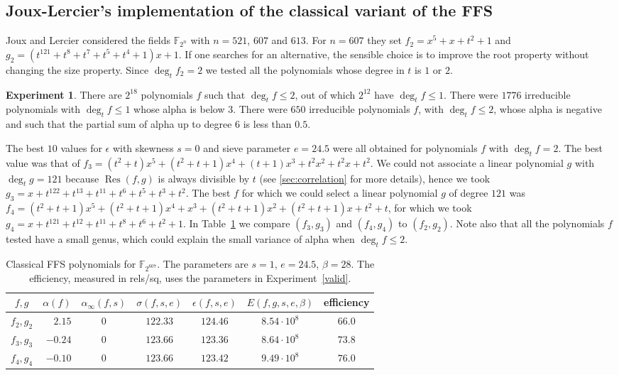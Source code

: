 \documentclass[a4wide]{article}
\newcommand{\F}{{\mathbb F}}
\DeclareMathOperator{\Res}{Res}
\theoremstyle{plain}
\theoremstyle{definition}
\newtheorem{experiment}{Experiment}
\theoremstyle{remark}
\begin{document}
\subsection{Joux-Lercier's implementation of the classical variant of the FFS}
\label{ssec:classical}
Joux and Lercier \cite{JoLe02,JoLe07} considered the fields $\F_{2^n}$ with
$n=521$, $607$ and $613$. For $n=607$ they set $f_2=x^5 + x + t^2 + 1$ and
$g_2=(t^{121} + t^8 + t^7 + t^5 + t^4 + 1)x + 1$. If one searches for an
alternative, the sensible choice is to improve the root property without
changing the size property. Since $\deg_tf_2=2$ we tested all the
polynomials whose degree in $t$ is $1$ or $2$. 
\begin{experiment}
	There are $2^{18}$ polynomials $f$ such that $\deg_tf\leq 2$, out
	of which $2^{12}$ have $\deg_tf\leq 1$. 
	There were $1776$ irreducible polynomials with $\deg_tf\leq 1$ whose
	alpha is below $3$. There were $650$ irreducible 
	polynomials $f$, with $\deg_t f\leq 2$, whose alpha is negative and
	such that the partial sum of alpha up to degree $6$ is less than $0.5$. 
	
	The best $10$ values for
$\epsilon$ with skewness $s=0$ and sieve parameter $e=24.5$ were all obtained
for polynomials $f$ with $\deg_t f=2$. The best value was that of
$f_3=(t^2 + t)x^5 + (t^2 + t + 1)x^4 + (t + 1)x^3 + t^2x^2 + t^2x + t^2$. We
could not associate a linear polynomial $g$ with $\deg_tg=121$ because
$\Res(f,g)$ is always divisible by $t$ (see \ref{sec:correlation} for more
details), hence we took $g_3=x + t^{122} +
t^{13} + t^{11} + t^6 + t^5 + t^3 + t^2$. The best $f$ for which we could
select a linear polynomial $g$ of degree $121$ was
$f_4=(t^2+t+1)x^5+(t^2+t+1)x^4+x^3+(t^2+t+1)x^2+(t^2+t+1)x+t^2+t$, for
which we took $g_4=x + t^{121} + t^{12} + t^{11} + t^8 + t^6 +
t^2 + 1$. In Table~\ref{table:JL} we compare $(f_3,g_3)$ and $(f_4,g_4)$ to
$(f_2,g_2)$. Note also that all the polynomials $f$ tested have a small genus,
which could explain the small variance of alpha when $\deg_t f\leq 2$.  
\end{experiment}


\begin{table}
\begin{center}
	\begin{tabular}{|c|rccccc|}
	\hline
	$f,g$ & $\alpha(f)$ & $\alpha_\infty(f,s)$ & $\sigma(f,s,e)$  &
	$\epsilon(f,s,e)$ & $E(f,g,s,e,\beta)$ &efficiency \\
	\hline
	$f_2,g_2$ & $2.15$ &   $0$        & $122.33$ & $124.46$ &
     $8.54\cdot 10^8$ & $66.0$  \\ 
	$f_3,g_3$ & $-0.24$&   $0$        & $123.66$ & $123.36$ & $8.64\cdot
	      10^8$ & $73.8$    \\
	$f_4,g_4$ & $-0.10$&   $0$        & $123.66$ & $123.42$ & $9.49\cdot
		10^8$ & $76.0$    \\
	\hline
	\end{tabular}
\end{center}
\caption{Classical FFS polynomials for $\F_{2^{607}}$. The parameters are
$s=1$, $e=24.5$, $\beta=28$. The efficiency, measured in rels/sq, uses the
parameters in Experiment~\ref{valid}.}
\label{table:JL}
\end{table}
\end{document}
